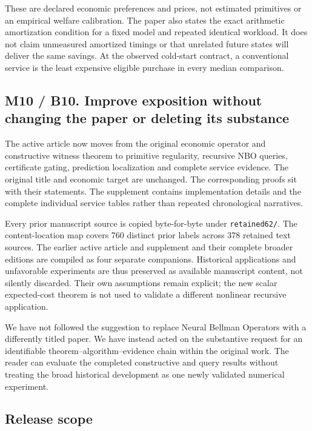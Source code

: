 \documentclass[ecta,nameyear,draft]{econsocart}
\begin{document}
These are declared economic preferences and prices, not estimated
primitives or an empirical welfare calibration. The paper also states
the exact arithmetic amortization condition for a fixed model and
repeated identical workload. It does not claim unmeasured amortized
timings or that unrelated future states will deliver the same savings.
At the observed cold-start contract, a conventional service is the least
expensive eligible purchase in every median comparison.

\hypertarget{m10-b10.-improve-exposition-without-changing-the-paper-or-deleting-its-substance}{%
\subsection{M10 / B10. Improve exposition without changing the paper or
deleting its
substance}\label{m10-b10.-improve-exposition-without-changing-the-paper-or-deleting-its-substance}}

The active article now moves from the original economic operator and
constructive witness theorem to primitive regularity, recursive NBO
queries, certificate gating, prediction localization and complete
service evidence. The original title and economic target are unchanged.
The corresponding proofs sit with their statements. The supplement
contains implementation details and the complete individual service
tables rather than repeated chronological narratives.

Every prior manuscript source is copied byte-for-byte under
\nolinkurl{retained62/}. The content-location map covers 760 distinct prior
labels across 378 retained text sources. The earlier active article and
supplement and their complete broader editions are compiled as four
separate companions. Historical applications and unfavorable experiments
are thus preserved as available manuscript content, not silently
discarded. Their own assumptions remain explicit; the new scalar
expected-cost theorem is not used to validate a different nonlinear
recursive application.

We have not followed the suggestion to replace Neural Bellman Operators
with a differently titled paper. We have instead acted on the
substantive request for an identifiable theorem--algorithm--evidence
chain within the original work. The reader can evaluate the completed
constructive and query results without treating the broad historical
development as one newly validated numerical experiment.

\hypertarget{release-scope}{%
\subsection{Release scope}\label{release-scope}}
\end{document}
